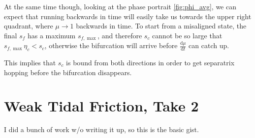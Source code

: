 \documentclass[11pt,
        usenames, %
        dvipsnames %
    ]{article}
\newcommand*{\rd}[2]{\frac{\mathrm{d}#1}{\mathrm{d}#2}}
\begin{document}
At the same time though, looking at the phase portrait \autoref{fig:phi_avg}, we
can expect that running backwards in time will easily take us towards the upper
right quadrant, where $\mu \to 1$ backwards in time. To start from a misaligned
state, the final $s_f$ has a maximum $s_{f, \max}$, and therefore $s_c$ cannot
be so large that $s_{f, \max} \eta_c < s_c$, otherwise the bifurcation will
arrive before $\rd{\mu}{t}$ can catch up.

This implies that $s_c$ is bound from both directions in order to get separatrix
hopping before the bifurcation disappears.

\section{Weak Tidal Friction, Take 2}

I did a bunch of work w/o writing it up, so this is the basic gist.
\end{document}
